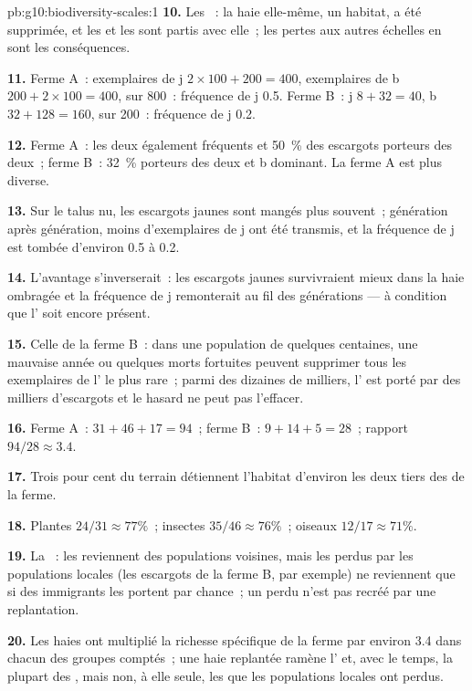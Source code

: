 \begin{solution}{pb:g10:biodiversity-scales:1}
\textbf{10.} Les ~: la haie elle-même, un habitat, a été
supprimée, et les  et les  sont partis avec elle~; les
pertes aux autres échelles en sont les conséquences.

\textbf{11.} Ferme A~: exemplaires de j $2 \times 100 + 200 = 400$,
exemplaires de b $200 + 2 \times 100 = 400$, sur 800~: fréquence de j
0.5. Ferme B~: j $8 + 32 = 40$, b $32 + 128 = 160$, sur 200~:
fréquence de j 0.2.

\textbf{12.} Ferme A~: les deux  également fréquents et 50~\%
des escargots porteurs des deux~; ferme B~: 32~\% porteurs des deux et
b dominant. La ferme A est plus diverse.

\textbf{13.} Sur le talus nu, les escargots jaunes sont mangés plus
souvent~; génération après génération, moins d'exemplaires de j ont été
transmis, et la fréquence de j est tombée d'environ 0.5 à 0.2.

\textbf{14.} L'avantage s'inverserait~: les escargots jaunes
survivraient mieux dans la haie ombragée et la fréquence de j
remonterait au fil des générations --- à condition que l' soit
encore présent.

\textbf{15.} Celle de la ferme B~: dans une population de quelques
centaines, une mauvaise année ou quelques morts fortuites peuvent
supprimer tous les exemplaires de l' le plus rare~; parmi des
dizaines de milliers, l' est porté par des milliers d'escargots
et le hasard ne peut pas l'effacer.

\textbf{16.} Ferme A~: $31 + 46 + 17 = 94$~; ferme B~:
$9 + 14 + 5 = 28$~; rapport $94/28 \approx 3.4$.

\textbf{17.} Trois pour cent du terrain détiennent l'habitat d'environ
les deux tiers des  de la ferme.

\textbf{18.} Plantes $24/31 \approx 77\%$~; insectes
$35/46 \approx 76\%$~; oiseaux $12/17 \approx 71\%$.

\textbf{19.} La ~: les  reviennent des
populations voisines, mais les  perdus par les populations
locales (les escargots de la ferme B, par exemple) ne reviennent que si
des immigrants les portent par chance~; un  perdu n'est pas
recréé par une replantation.

\textbf{20.} Les haies ont multiplié la richesse spécifique de la ferme
par environ 3.4 dans chacun des groupes comptés~; une haie replantée
ramène l' et, avec le temps, la plupart des , mais
non, à elle seule, les  que les populations locales ont perdus.
\end{solution}
